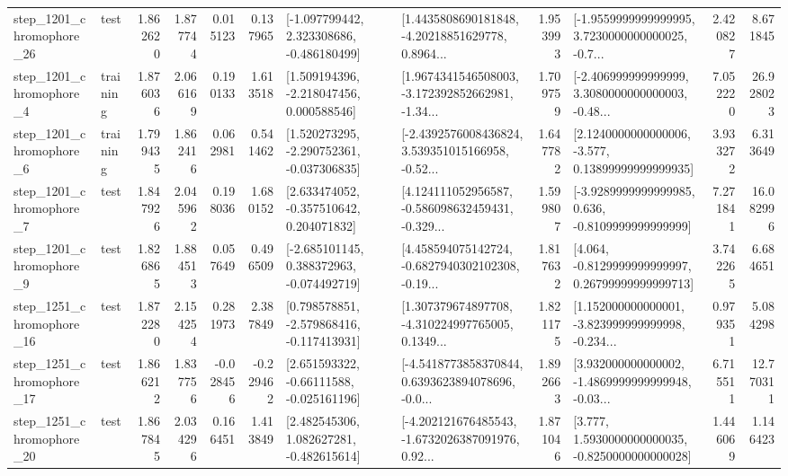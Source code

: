 \begin{tabular}{llrrrrllrlrr}
 step\_1201\_chromophore\_26 &      test &      1.862620 &    1.877744 &      0.015123 &  0.137965 &   [-1.097799442, 2.323308686, -0.486180499] &  [1.4435808690181848, -4.20218851629778, 0.8964... &       1.953993 &  [-1.9559999999999995, 3.7230000000000025, -0.7... &            2.420827 &          8.671845 \\
  step\_1201\_chromophore\_4 &  training &      1.876036 &    2.066169 &      0.190133 &  1.613518 &    [1.509194396, -2.218047456, 0.000588546] &  [1.9674341546508003, -3.172392852662981, -1.34... &       1.709759 &  [-2.406999999999999, 3.3080000000000003, -0.48... &            7.052220 &         26.928023 \\
  step\_1201\_chromophore\_6 &  training &      1.799435 &    1.862416 &      0.062981 &  0.541462 &   [1.520273295, -2.290752361, -0.037306835] &  [-2.4392576008436824, 3.539351015166958, -0.52... &       1.647782 &  [2.1240000000000006, -3.577, 0.13899999999999935] &            3.933272 &          6.313649 \\
  step\_1201\_chromophore\_7 &      test &      1.847926 &    2.045962 &      0.198036 &  1.680152 &    [2.633474052, -0.357510642, 0.204071832] &  [4.124111052956587, -0.586098632459431, -0.329... &       1.599807 &  [-3.9289999999999985, 0.636, -0.8109999999999999] &            7.271841 &         16.082996 \\
  step\_1201\_chromophore\_9 &      test &      1.826865 &    1.884513 &      0.057649 &  0.496509 &   [-2.685101145, 0.388372963, -0.074492719] &  [4.458594075142724, -0.6827940302102308, -0.19... &       1.817632 &  [4.064, -0.8129999999999997, 0.26799999999999713] &            3.742265 &          6.684651 \\
 step\_1251\_chromophore\_16 &      test &      1.872280 &    2.154254 &      0.281973 &  2.387849 &   [0.798578851, -2.579868416, -0.117413931] &  [1.307379674897708, -4.310224997765005, 0.1349... &       1.821175 &  [1.152000000000001, -3.823999999999998, -0.234... &            0.979351 &          5.084298 \\
 step\_1251\_chromophore\_17 &      test &      1.866212 &    1.837756 &     -0.028456 & -0.229462 &    [2.651593322, -0.66111588, -0.025161196] &  [-4.5418773858370844, 0.6393623894078696, -0.0... &       1.892663 &  [3.932000000000002, -1.4869999999999948, -0.03... &            6.715511 &         12.770311 \\
 step\_1251\_chromophore\_20 &      test &      1.867845 &    2.034296 &      0.166451 &  1.413849 &    [2.482545306, 1.082627281, -0.482615614] &  [-4.202121676485543, -1.6732026387091976, 0.92... &       1.871046 &   [3.777, 1.5930000000000035, -0.8250000000000028] &            1.446069 &          1.146423 \\

\end{tabular}
